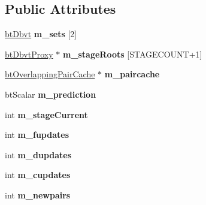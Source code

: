 \subsection*{Public Attributes}
\begin{DoxyCompactItemize}
\item 
\hypertarget{structbt_dbvt_broadphase_a61ed6a96feae95689f7e7b15318b45fe}{\hyperlink{structbt_dbvt}{bt\+Dbvt} {\bfseries m\+\_\+sets} \mbox{[}2\mbox{]}}\label{structbt_dbvt_broadphase_a61ed6a96feae95689f7e7b15318b45fe}

\item 
\hypertarget{structbt_dbvt_broadphase_a38a0d79a2b4b8ef29a7ddb79d176f59b}{\hyperlink{structbt_dbvt_proxy}{bt\+Dbvt\+Proxy} $\ast$ {\bfseries m\+\_\+stage\+Roots} \mbox{[}S\+T\+A\+G\+E\+C\+O\+U\+N\+T+1\mbox{]}}\label{structbt_dbvt_broadphase_a38a0d79a2b4b8ef29a7ddb79d176f59b}

\item 
\hypertarget{structbt_dbvt_broadphase_ae50358fbe86a3ae2fd866da56dd4c14d}{\hyperlink{classbt_overlapping_pair_cache}{bt\+Overlapping\+Pair\+Cache} $\ast$ {\bfseries m\+\_\+paircache}}\label{structbt_dbvt_broadphase_ae50358fbe86a3ae2fd866da56dd4c14d}

\item 
\hypertarget{structbt_dbvt_broadphase_a845f50b4f39731f504e30232fc6bd3df}{bt\+Scalar {\bfseries m\+\_\+prediction}}\label{structbt_dbvt_broadphase_a845f50b4f39731f504e30232fc6bd3df}

\item 
\hypertarget{structbt_dbvt_broadphase_a73eca8e613cdb58fa5a0683d532391d2}{int {\bfseries m\+\_\+stage\+Current}}\label{structbt_dbvt_broadphase_a73eca8e613cdb58fa5a0683d532391d2}

\item 
\hypertarget{structbt_dbvt_broadphase_a6bce6ec08430397703831d2e984f2ef2}{int {\bfseries m\+\_\+fupdates}}\label{structbt_dbvt_broadphase_a6bce6ec08430397703831d2e984f2ef2}

\item 
\hypertarget{structbt_dbvt_broadphase_a4567abb3b5025ddb79660945ccafba8f}{int {\bfseries m\+\_\+dupdates}}\label{structbt_dbvt_broadphase_a4567abb3b5025ddb79660945ccafba8f}

\item 
\hypertarget{structbt_dbvt_broadphase_aea172d009af50647fd4024bfd798ed31}{int {\bfseries m\+\_\+cupdates}}\label{structbt_dbvt_broadphase_aea172d009af50647fd4024bfd798ed31}

\item 
\hypertarget{structbt_dbvt_broadphase_ad7842ea05865770fa4bde1adc7c6380f}{int {\bfseries m\+\_\+newpairs}}\label{structbt_dbvt_broadphase_ad7842ea05865770fa4bde1adc7c6380f}


\end{DoxyCompactItemize}
